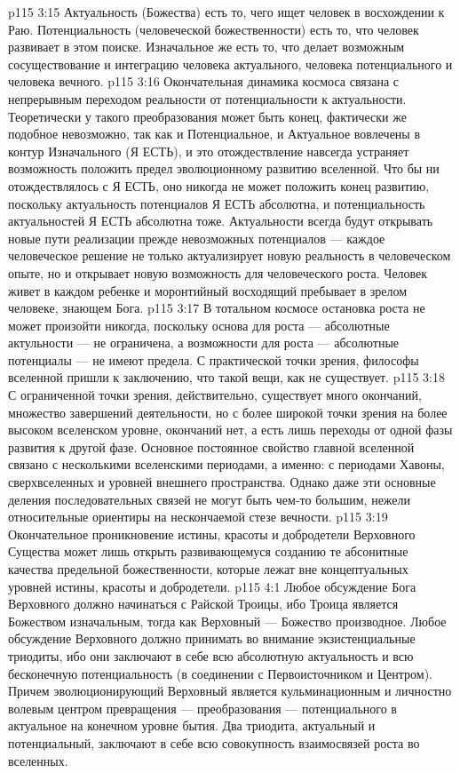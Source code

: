 \vs p115 3:15 Актуальность (Божества) есть то, чего ищет человек в восхождении к Раю. Потенциальность (человеческой божественности) есть то, что человек развивает в этом поиске. Изначальное же есть то, что делает возможным сосуществование и интеграцию человека актуального, человека потенциального и человека вечного.
\vs p115 3:16 \pc Окончательная динамика космоса связана с непрерывным переходом реальности от потенциальности к актуальности. Теоретически у такого преобразования может быть конец, фактически же подобное невозможно, так как и Потенциальное, и Актуальное вовлечены в контур Изначального (Я ЕСТЬ), и это отождествление навсегда устраняет возможность положить предел эволюционному развитию вселенной. Что бы ни отождествлялось с Я ЕСТЬ, оно никогда не может положить конец развитию, поскольку актуальность потенциалов Я ЕСТЬ абсолютна, и потенциальность актуальностей Я ЕСТЬ абсолютна тоже. Актуальности всегда будут открывать новые пути реализации прежде невозможных потенциалов --- каждое человеческое решение не только актуализирует новую реальность в человеческом опыте, но и открывает новую возможность для человеческого роста. Человек живет в каждом ребенке и моронтийный восходящий пребывает в зрелом человеке, знающем Бога.
\vs p115 3:17 В тотальном космосе остановка роста не может произойти никогда, поскольку основа для роста --- абсолютные актульности --- не ограничена, а возможности для роста --- абсолютные потенциалы --- не имеют предела. С практической точки зрения, философы вселенной пришли к заключению, что такой вещи, как  не существует.
\vs p115 3:18 С ограниченной точки зрения, действительно, существует много окончаний, множество завершений деятельности, но с более широкой точки зрения на более высоком вселенском уровне, окончаний нет, а есть лишь переходы от одной фазы развития к другой фазе. Основное постоянное свойство главной вселенной связано с несколькими вселенскими периодами, а именно: с периодами Хавоны, сверхвселенных и уровней внешнего пространства. Однако даже эти основные деления последовательных связей не могут быть чем\hyp{}то большим, нежели относительные ориентиры на нескончаемой стезе вечности.
\vs p115 3:19 Окончательное проникновение истины, красоты и добродетели Верховного Существа может лишь открыть развивающемуся созданию те абсонитные качества предельной божественности, которые лежат вне концептуальных уровней истины, красоты и добродетели.
\vs p115 4:1 Любое обсуждение  Бога Верховного должно начинаться с Райской Троицы, ибо Троица является Божеством изначальным, тогда как Верховный --- Божество производное. Любое обсуждение  Верховного должно принимать во внимание экзистенциальные триодиты, ибо они заключают в себе всю абсолютную актуальность и всю бесконечную потенциальность (в соединении с Первоисточником и Центром). Причем эволюционирующий Верховный является кульминационным и личностно волевым центром превращения --- преобразования --- потенциального в актуальное на конечном уровне бытия. Два триодита, актуальный и потенциальный, заключают в себе всю совокупность взаимосвязей роста во вселенных.
